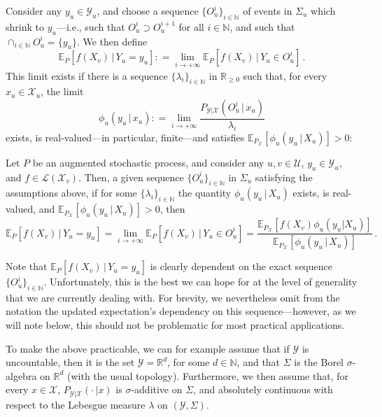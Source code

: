 \documentclass[twoside,11pt]{article}
\newcommand{\nats}{\mathbb{N}}
\newcommand{\reals}{\mathbb{R}}
\newcommand{\realsnonneg}{\reals_{\geq 0}}
\newcommand{\states}{\mathcal{X}}
\newcommand{\observs}{\mathcal{Y}}
\newcommand{\gambles}{\mathcal{L}}
\newcommand{\coloneqq}{:\!=}
\begin{document}
Consider any $y_u\in\observs_u$, and choose a sequence $\{O_u^i\}_{i\in\nats}$ of events in $\Sigma_u$ which shrink to $y_u$---i.e., such that $O_u^i\supset O_u^{i+1}$ for all $i\in\nats$, and such that $\cap_{i\in\nats} O_u^i=\{y_u\}$. We then define
\begin{equation*}
\mathbb{E}_P[f(X_v)\,\vert\,Y_u=y_u] \coloneqq \lim_{i\to+\infty} \mathbb{E}_P[f(X_v)\,\vert\,Y_u\in O_u^i]\,.
\end{equation*}
This limit exists if there is a sequence $\{\lambda_i\}_{i\in\nats}$ in $\realsnonneg$ such that, for every $x_u\in\states_u$, the limit
\begin{equation*}
\phi_u(y_u\,\vert\, x_u) \coloneqq \lim_{i\to+\infty}\frac{P_{\observs\vert\states}(O_u^i\,\vert\, x_u)}{\lambda_i}
\end{equation*}
exists, is real-valued---in particular, finite---and satisfies $\mathbb{E}_{P_\states}[\phi_u(y_u\,\vert\,X_u)]>0$:
\begin{proposition}\label{prop:precise_bayes_rule_densities}
Let $P$ be an augmented stochastic process, and consider any $u,v\in\mathcal{U}$, $y_u\in\observs_u$, and $f\in\gambles(\states_v)$. Then, a given sequence $\{O_u^i\}_{i\in\nats}$ in $\Sigma_u$ satisfying the assumptions above, if for some $\{\lambda_i\}_{i\in\nats}$ the quantity $\phi_u(y_u\,\vert\,X_u)$ exists, is real-valued, and $\mathbb{E}_{P_\states}[\phi_u(y_u\,\vert\,X_u)]>0$, then
\begin{equation}\label{eq:updated_expectation_is_limit}
\mathbb{E}_P[f(X_v)\,\vert\,Y_u=y_u] = \lim_{i\to+\infty} \mathbb{E}_P[f(X_v)\,\vert\,Y_u\in O_u^i] = \frac{\mathbb{E}_{P_\states}[f(X_v)\phi_u(y_u\vert X_u)]}{\mathbb{E}_{P_\states}[\phi_u(y_u\,\vert\,X_u)]}\,.
\end{equation}
\end{proposition}
Note that $\mathbb{E}_P[f(X_v)\,\vert\,Y_u=y_u]$ is clearly dependent on the exact sequence $\{O_u^i\}_{i\in\nats}$. Unfortunately, this is the best we can hope for at the level of generality that we are currently dealing with. %
For brevity, we nevertheless omit from the notation the updated expectation's dependency on this sequence---however, as we will note below, this should not be problematic for most practical applications.

To make the above practicable, we can for example assume that if $\observs$ is uncountable, then it is the set $\observs=\reals^d$, for some $d\in\nats$, and that $\Sigma$ is the Borel $\sigma$-algebra on $\reals^d$ (with the usual topology). Furthermore, we then assume that, for every $x\in\states$, $P_{\observs\vert\states}(\cdot\,\vert x)$ is $\sigma$-additive on $\Sigma$, and absolutely continuous with respect to the Lebesgue measure $\lambda$ on $(\observs,\Sigma)$. 
\end{document}
